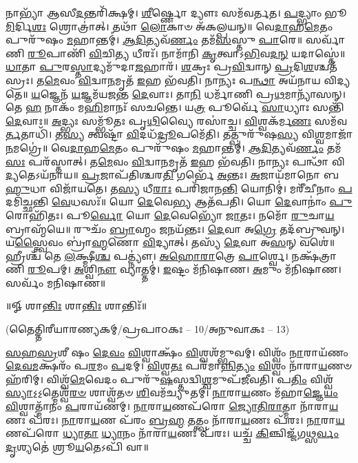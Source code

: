 % 
𑌨𑌾𑌭𑍍𑌯𑌾᳴ 𑌆𑌸𑍀\-\ul{𑌦}\-𑌨𑍍𑌤𑌰𑌿᳴𑌕𑍍𑌷𑌮𑍍। 
\-\ul{𑌶𑍀}\-𑌰𑍍𑌷𑍍𑌣𑍋 𑌦𑍍𑌯𑍗𑌃 𑌸𑌮᳴𑌵𑌰𑍍𑌤𑌤। 
\-\ul{𑌪}\-𑌦𑍍𑌭𑍍𑌯𑌾𑌂 𑌭𑍂\-\ul{𑌮𑌿}\-𑌰𑍍𑌦𑌿\-\ul{𑌶𑌃} 𑌶𑍍𑌰𑍋𑌤𑍍𑌰𑌾॑𑌤𑍍। 
𑌤𑌥𑌾᳴ \ul{𑌲𑍋}\-𑌕𑌾𑍞 𑌅᳴𑌕𑌲𑍍𑌪𑌯𑌨𑍍॥ 
% 
𑌵𑍇\-\ul{𑌦𑌾}\-𑌹\-\ul{𑌮𑍇}\-𑌤𑌂 𑌪𑍁𑌰𑍁᳴𑌷𑌂 \ul{𑌮}\-𑌹𑌾𑌨𑍍𑌤𑌮𑍍॑। 
\-\ul{𑌆}\-\-\ul{𑌦𑌿}\-𑌤𑍍𑌯𑌵᳴\-\ul{𑌰𑍍𑌣𑌂} 𑌤𑌮᳴\-\ul{𑌸}\-𑌸𑍍𑌤𑍁 \ul{𑌪𑌾}\-𑌰𑍇॥ 
% 
𑌸𑌰𑍍𑌵𑌾᳴𑌣𑌿 \ul{𑌰𑍂}\-𑌪𑌾𑌣𑌿᳴ \ul{𑌵𑌿}\-𑌚𑌿\-\ul{𑌤𑍍𑌯} 𑌧𑍀𑌰𑌃᳴। 
𑌨𑌾𑌮𑌾᳴𑌨𑌿 \ul{𑌕𑍃}\-𑌤𑍍𑌵𑌾𑌽\-\ul{𑌭𑌿}\-𑌵\-\ul{𑌦}\-\-\ul{𑌨𑍍} 𑌯𑌦𑌾𑌸𑍍𑌤𑍇॑॥ 
% 
\-\ul{𑌧𑌾}\-𑌤𑌾 \ul{𑌪𑍁}\-𑌰\-\ul{𑌸𑍍𑌤𑌾}\-𑌦𑍍𑌯𑌮𑍁᳴𑌦𑌾\-\ul{𑌜}\-𑌹𑌾𑌰᳴। 
\-\ul{𑌶}\-𑌕𑍍𑌰𑌃 𑌪𑍍𑌰\-\ul{𑌵𑌿}\-𑌦𑍍𑌵𑌾𑌨𑍍  \ul{𑌪𑍍𑌰}\-𑌦𑌿\-\ul{𑌶}\-𑌶𑍍𑌚𑌤᳴𑌸𑍍𑌰𑌃। 
𑌤\-\ul{𑌮𑍇}\-𑌵𑌂 \ul{𑌵𑌿}\-𑌦𑍍𑌵𑌾\-\ul{𑌨}\-𑌮𑍃𑌤᳴ \ul{𑌇}\-𑌹 𑌭᳴𑌵𑌤𑌿। 
𑌨𑌾𑌨𑍍𑌯𑌃 𑌪\-\ul{𑌨𑍍𑌥𑌾} 𑌅𑌯᳴𑌨𑌾𑌯 𑌵𑌿𑌦𑍍𑌯𑌤𑍇॥ 
% 
\-\ul{𑌯}\-𑌜𑍍𑌞𑍇𑌨᳴ \ul{𑌯}\-𑌜𑍍𑌞𑌮᳴𑌯𑌜𑌨𑍍𑌤 \ul{𑌦𑍇}\-𑌵𑌾𑌃। 
𑌤𑌾\-\ul{𑌨𑌿} 𑌧𑌰𑍍𑌮𑌾᳴𑌣𑌿 𑌪𑍍𑌰\-\ul{𑌥}\-𑌮𑌾𑌨𑍍𑌯𑌾᳴𑌸𑌨𑍍। 
𑌤𑍇 \ul{𑌹} 𑌨𑌾𑌕𑌂᳴ 𑌮\-\ul{𑌹𑌿}\-𑌮𑌾𑌨𑌃᳴ 𑌸𑌚𑌨𑍍𑌤𑍇। 
𑌯\-\ul{𑌤𑍍𑌰} 𑌪𑍂𑌰𑍍𑌵𑍇᳴ \ul{𑌸𑌾}\-𑌧𑍍𑌯𑌾𑌃 𑌸𑌨𑍍𑌤𑌿᳴ \ul{𑌦𑍇}\-𑌵𑌾𑌃॥ 
% 
\-\ul{𑌅}\-𑌦𑍍𑌭𑍍𑌯𑌃 𑌸𑌮𑍍𑌭𑍂᳴𑌤𑌃 𑌪𑍃\-\ul{𑌥𑌿}\-𑌵𑍍𑌯𑍈 𑌰𑌸𑌾॑𑌚𑍍𑌚। 
\-\ul{𑌵𑌿}\-𑌶𑍍𑌵𑌕᳴𑌰𑍍𑌮\-\ul{𑌣𑌃} 𑌸𑌮᳴𑌵\-\ul{𑌰𑍍𑌤}\-𑌤𑌾𑌧𑌿᳴। 
𑌤\-\ul{𑌸𑍍𑌯} 𑌤𑍍𑌵𑌷𑍍𑌟𑌾᳴ \ul{𑌵𑌿}\-𑌦𑌧᳴\-\ul{𑌦𑍍𑌰𑍂}\-𑌪𑌮𑍇᳴𑌤𑌿। 
𑌤𑌤𑍍𑌪𑍁𑌰𑍁᳴𑌷\-\ul{𑌸𑍍𑌯} 𑌵𑌿\-\ul{𑌶𑍍𑌵}\-𑌮𑌾𑌜𑌾᳴\-\ul{𑌨}\-𑌮𑌗𑍍𑌰𑍇॑॥ 
% 
𑌵𑍇\-\ul{𑌦𑌾}\-𑌹\-\ul{𑌮𑍇}\-𑌤𑌂 𑌪𑍁𑌰𑍁᳴𑌷𑌂 \ul{𑌮}\-𑌹𑌾𑌨𑍍𑌤𑌮𑍍॑। 
\-\ul{𑌆}\-\-\ul{𑌦𑌿}\-𑌤𑍍𑌯𑌵᳴\-\ul{𑌰𑍍𑌣𑌂} 𑌤𑌮᳴\-\ul{𑌸𑌃} 𑌪𑌰᳴𑌸𑍍𑌤𑌾𑌤𑍍। 
𑌤\-\ul{𑌮𑍇}\-𑌵𑌂 \ul{𑌵𑌿}\-𑌦𑍍𑌵𑌾\-\ul{𑌨}\-𑌮𑍃𑌤᳴ \ul{𑌇}\-𑌹 𑌭᳴𑌵𑌤𑌿। 
𑌨𑌾𑌨𑍍𑌯𑌃 𑌪𑌨𑍍𑌥𑌾᳴ 𑌵𑌿\-\ul{𑌦𑍍𑌯}\-𑌤𑍇𑌽𑌯᳴𑌨𑌾𑌯॥ 
% 
\-\ul{𑌪𑍍𑌰}\-𑌜𑌾𑌪᳴𑌤𑌿𑌶𑍍𑌚𑌰\-\ul{𑌤𑌿} 𑌗𑌰𑍍𑌭𑍇᳴ \ul{𑌅}\-𑌨𑍍𑌤𑌃। 
\-\ul{𑌅}\-𑌜𑌾𑌯᳴𑌮𑌾𑌨𑍋 𑌬\-\ul{𑌹𑍁}\-𑌧𑌾 𑌵𑌿𑌜𑌾᳴𑌯𑌤𑍇। 
𑌤\-\ul{𑌸𑍍𑌯} 𑌧𑍀\-\ul{𑌰𑌾𑌃} 𑌪𑌰𑌿᳴𑌜𑌾𑌨\-\ul{𑌨𑍍𑌤𑌿} 𑌯𑍋𑌨𑌿𑌮𑍍॑। 
𑌮𑌰𑍀᳴𑌚𑍀𑌨𑌾𑌂 \ul{𑌪}\-𑌦𑌮𑌿᳴𑌚𑍍𑌛𑌨𑍍𑌤𑌿 \ul{𑌵𑍇}\-𑌧𑌸𑌃᳴॥ 
% 
𑌯𑍋 \ul{𑌦𑍇}\-𑌵𑍇\-\ul{𑌭𑍍𑌯} 𑌆𑌤᳴𑌪𑌤𑌿। 
𑌯𑍋 \ul{𑌦𑍇}\-𑌵𑌾𑌨𑌾𑌂॑ \ul{𑌪𑍁}\-𑌰𑍋𑌹𑌿᳴𑌤𑌃। 
𑌪𑍂\-\ul{𑌰𑍍𑌵𑍋} 𑌯𑍋 \ul{𑌦𑍇}\-𑌵𑍇𑌭𑍍𑌯𑍋᳴ \ul{𑌜𑌾}\-𑌤𑌃। 
𑌨𑌮𑍋᳴ \ul{𑌰𑍁}\-𑌚𑌾\-\ul{𑌯} 𑌬𑍍𑌰𑌾𑌹𑍍𑌮᳴𑌯𑍇॥ 
% 
𑌰𑍁𑌚𑌂᳴ \ul{𑌬𑍍𑌰𑌾}\-𑌹𑍍𑌮𑌂 \ul{𑌜}\-𑌨𑌯᳴𑌨𑍍𑌤𑌃। 
\-\ul{𑌦𑍇}\-𑌵𑌾 𑌅\-\ul{𑌗𑍍𑌰𑍇} 𑌤𑌦᳴𑌬𑍍𑌰𑍁𑌵𑌨𑍍। 
𑌯\-\ul{𑌸𑍍𑌤𑍍𑌵𑍈}\-𑌵𑌂 𑌬𑍍𑌰𑌾॑\-\ul{𑌹𑍍𑌮}\-𑌣𑍋 \ul{𑌵𑌿}\-𑌦𑍍𑌯𑌾𑌤𑍍। 
𑌤𑌸𑍍𑌯᳴ \ul{𑌦𑍇}\-𑌵𑌾 𑌅\-\ul{𑌸}\-𑌨𑍍 𑌵𑌶𑍇॑॥ 
% 
𑌹𑍍𑌰𑍀𑌶𑍍𑌚᳴ 𑌤𑍇 \ul{𑌲}\-𑌕𑍍𑌷𑍍𑌮𑍀\-\ul{𑌶𑍍𑌚} 𑌪𑌤𑍍𑌨𑍍𑌯𑍗॑। 
\-\ul{𑌅}\-\-\ul{𑌹𑍋}\-\-\ul{𑌰𑌾}\-𑌤𑍍𑌰𑍇 \ul{𑌪𑌾}\-𑌰𑍍𑌶𑍍𑌵𑍇। 
𑌨𑌕𑍍𑌷᳴𑌤𑍍𑌰𑌾𑌣𑌿 \ul{𑌰𑍂}\-𑌪𑌮𑍍। 
\-\ul{𑌅}\-𑌶𑍍𑌵𑌿\-\ul{𑌨𑍗} 𑌵𑍍𑌯𑌾𑌤𑍍𑌤𑌮𑍍॑। 
\-\ul{𑌇}\-𑌷𑍍𑌟𑌂 𑌮᳴𑌨𑌿𑌷𑌾𑌣। 
\-\ul{𑌅}\-𑌮𑍁𑌂 𑌮᳴𑌨𑌿𑌷𑌾𑌣। 
𑌸𑌰𑍍𑌵𑌂᳴ 𑌮𑌨𑌿𑌷𑌾𑌣॥ 
% 
\centerline{॥𑍐 𑌶𑌾\-\ul{𑌨𑍍𑌤𑌿𑌃} 𑌶𑌾\-\ul{𑌨𑍍𑌤𑌿𑌃} 𑌶𑌾𑌨𑍍𑌤𑌿𑌃᳴॥}

\centerline{\scriptsize(𑌤𑍈𑌤𑍍𑌤𑌿𑌰𑍀𑌯𑌾𑌰𑌣𑍍𑌯𑌕𑌮𑍍/𑌪𑍍𑌰𑌪𑌾𑌠𑌕𑌃 – 10/𑌅𑌨𑍁𑌵𑌾𑌕𑌃 – 13)}

\-\ul{𑌸}\-\-\ul{𑌹}\-\-\ul{𑌸𑍍𑌰}\-𑌶𑍀\sr%
𑌷𑌂 \ul{𑌦𑍇}\-\-\ul{𑌵𑌂} \ul{𑌵𑌿}\-𑌶𑍍𑌵𑌾𑌕𑍍𑌷𑌂᳴ \ul{𑌵𑌿}\-𑌶𑍍𑌵𑌶᳴𑌮𑍍𑌭𑍁𑌵𑌮𑍍। 𑌵𑌿𑌶𑍍𑌵𑌂᳴ \ul{𑌨𑌾}\-𑌰𑌾𑌯᳴𑌣𑌂 \ul{𑌦𑍇}\-\-\ul{𑌵}\-\-\ul{𑌮}\-𑌕𑍍𑌷𑌰𑌂᳴ 𑌪\-\ul{𑌰}\-𑌮𑌂 \ul{𑌪}\-𑌦𑌮𑍍। 
\-\ul{𑌵𑌿}\-𑌶𑍍𑌵\-\ul{𑌤𑌃} 𑌪𑌰᳴𑌮𑌾\-\ul{𑌨𑍍𑌨𑌿}\-\-\ul{𑌤𑍍𑌯𑌂} \ul{𑌵𑌿}\-𑌶𑍍𑌵𑌂 𑌨𑌾᳴𑌰𑌾\-\ul{𑌯}\-𑌣𑍞 𑌹᳴𑌰𑌿𑌮𑍍। 𑌵𑌿𑌶𑍍𑌵᳴\-\ul{𑌮𑍇}\-𑌵𑍇𑌦𑌂 𑌪𑍁𑌰𑍁᳴\-\ul{𑌷}\-𑌸𑍍𑌤𑌦𑍍𑌵𑌿\-\ul{𑌶𑍍𑌵}\-𑌮𑍁𑌪᳴𑌜𑍀𑌵𑌤𑌿। 
𑌪\-\ul{𑌤𑌿𑌂}   𑌵𑌿𑌶𑍍𑌵᳴\-\ul{𑌸𑍍𑌯𑌾}\-𑌽॒𑌽॒𑌤𑍍𑌮𑍇𑌶𑍍𑌵᳴\-\ul{𑌰}\-\-\ul{𑍞} 𑌶𑌾𑌶𑍍𑌵᳴𑌤𑍞 \ul{𑌶𑌿}\-𑌵𑌮᳴𑌚𑍍𑌯𑍁𑌤𑌮𑍍। \ul{𑌨𑌾}\-𑌰𑌾\-\ul{𑌯}\-𑌣𑌂 𑌮᳴𑌹𑌾\-\ul{𑌜𑍍𑌞𑍇}\-\-\ul{𑌯𑌂} \ul{𑌵𑌿}\-𑌶𑍍𑌵𑌾𑌤𑍍𑌮𑌾᳴𑌨𑌂 \ul{𑌪}\-𑌰𑌾𑌯᳴𑌣𑌮𑍍। \ul{𑌨𑌾}\-𑌰𑌾\-\ul{𑌯}\-𑌣𑌪᳴𑌰𑍋 \ul{𑌜𑍍𑌯𑍋}\-\-\ul{𑌤𑌿}\-\-\ul{𑌰𑌾}\-𑌤𑍍𑌮𑌾 𑌨𑌾᳴𑌰𑌾\-\ul{𑌯}\-𑌣𑌃 𑌪᳴𑌰𑌃। \ul{𑌨𑌾}\-𑌰𑌾\-\ul{𑌯}\-𑌣 𑌪᳴𑌰𑌂 \ul{𑌬𑍍𑌰}\-\-\ul{𑌹𑍍𑌮} \ul{𑌤}\-𑌤𑍍𑌤𑍍𑌵𑌂 𑌨𑌾᳴𑌰𑌾\-\ul{𑌯}\-𑌣𑌃 𑌪᳴𑌰𑌃। \ul{𑌨𑌾}\-𑌰𑌾\-\ul{𑌯}\-𑌣𑌪᳴𑌰𑍋 \ul{𑌧𑍍𑌯𑌾}\-\-\ul{𑌤𑌾} \ul{𑌧𑍍𑌯𑌾}\-𑌨𑌂 𑌨𑌾᳴𑌰𑌾\-\ul{𑌯}\-𑌣𑌃 𑌪᳴𑌰𑌃। 𑌯𑌚𑍍𑌚᳴ \ul{𑌕𑌿}\-𑌞𑍍𑌚𑌿𑌜𑍍𑌜᳴𑌗\-\ul{𑌥𑍍𑌸}\-\-\ul{𑌰𑍍𑌵𑌂} \ul{𑌦𑍃}\-𑌶𑍍𑌯𑌤𑍇॑ 𑌶𑍍𑌰𑍂\-\ul{𑌯}\-𑌤𑍇𑌽𑌪𑌿᳴ 𑌵𑌾॥ 

